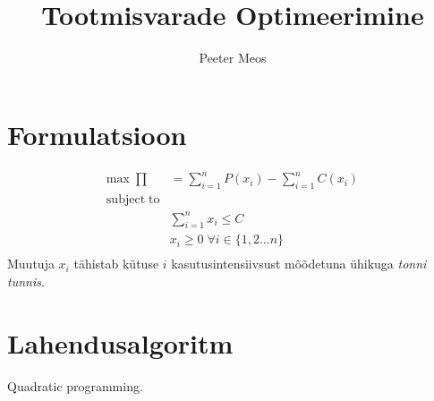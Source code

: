 \documentclass[twosided, 11pt, a4paper]{article}
\title{Tootmisvarade Optimeerimine}
\author{Peeter Meos}
\begin{document}
\maketitle

\section{Formulatsioon}
\begin{align}
\mathrm{max}\; \prod &= \sum_{i=1}^n P(x_i) - \sum_{i=1}^n C(x_i)\nonumber\\
\mathrm{subject \; to} &\nonumber \\
&\sum_{i=1}^n x_i \le C \nonumber \\
&x_i \ge 0 \; \forall i \in \{1,2 \dots n\} \nonumber \\
\nonumber
\end{align}
Muutuja $x_i$ t\"ahistab k\"utuse $i$ kasutusintensiivsust m\~o\~odetuna \"uhikuga \emph{tonni tunnis}.
\section {Lahendusalgoritm}
Quadratic programming.
\end{document}
